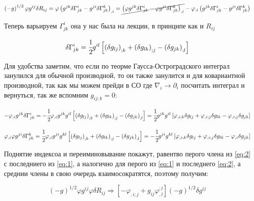 \documentclass[a4paper]{article}
\newcommand{\inner}[1]{\left( #1 \right)}
\newcommand{\insqr}[1]{\left[ #1 \right]}
\renewcommand{\phi}{\varphi}
\numberwithin{equation}{section}
\begin{document}
\begin{equation}
    \inner{-g}^{1/2} \phi g^{ij} \delta R_{ij} = 
    \phi\inner{g^{jk} \delta \Gamma^{i}_{jk} - g^{ji} \delta \Gamma^{k}_{jk}}_{,i}
    = 
    \cancel{\inner{ \phi g^{jk} \delta \Gamma^{i}_{jk} - \phi g^{ji} \delta \Gamma^{k}_{jk}}_{,i}}
    - \phi_{,i} \inner{g^{jk} \delta \Gamma^{i}_{jk} - g^{ji} \delta \Gamma^{k}_{jk}}
\end{equation}

Теперь варьируем $\Gamma^i_{jk}$ она у нас была на лекции, в принципе как и $R_{ij}$

\begin{equation}
    \delta \Gamma^i_{jk} = \cfrac{1}{2} g^{il} \insqr{\inner{\delta g_{lj}}_{;k} +
    \inner{\delta g_{lk}}_{;j} - \inner{\delta g_{jk}}_{;l}}
\end{equation}


Для удобства заметим, что если по  теорме Гаусса-Остроградского 
интеграл занулился для обычной производной, то он также занулится и для ковариантной 
производной, так как мы можем прейди в СО где $\nabla_i \to \partial_i$ посчитать интеграл и вернуться, 
так же вспомним $g_{ij;k} = 0$:

\begin{equation}
    \label{eq:1}
    - \phi_{,i} g^{jk} \delta \Gamma^{i}_{jk}
    = - \cfrac{1}{2} \phi_{,i} g^{jk} g^{il} \insqr{\inner{\delta g_{lj}}_{;k} +
    \inner{\delta g_{lk}}_{;j} - \inner{\delta g_{jk}}_{;l}}
    = \cfrac{1}{2} g^{jk} g^{il} \insqr{\phi_{,i;k}\delta g_{lj} +
    \phi_{,i;j} \delta g_{lk} - \phi_{,i;j} \delta g_{jk}}
\end{equation}

\begin{equation}
    \label{eq:2}
    \phi_{,i} \phi g^{ji} \delta \Gamma^{k}_{jk} =
    \cfrac{1}{2} \phi_{,i} g^{ji} g^{kl} \insqr{\inner{\delta g_{lj}}_{;k} +
    \inner{\delta g_{lk}}_{;j} - \inner{\delta g_{jk}}_{;l}}
    = - \cfrac{1}{2} g^{ji} g^{kl} \insqr{\phi_{,i;k} \delta g_{lj} +
    \phi_{,i;j}\delta g_{lk} - \phi_{,i}\delta g_{jk}}
\end{equation}

Поднятие индексоа и переиминовывание покажут, равентво перого члена из \ref{eq:2} с последниего из \ref{eq:1}, 
а налогично для перого из \ref{eq:1} и последнего \ref{eq:2}, а среднии члены
в свою очередь взаимосократятся, поэтому получим: 

\begin{equation}
    \inner{-g}^{1/2} \phi g^{ij} \phi \delta R_{ij} \Rightarrow 
    \insqr{-\phi_{,i;j} + g_{ij} \phi_{,l}^{;l}} \inner{-g}^{1/2} \delta g^{ij} 
\end{equation}
\end{document}
